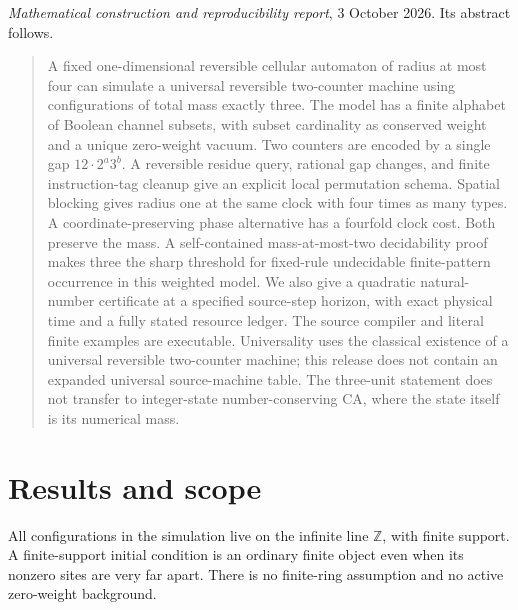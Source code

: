 \documentclass[11pt,letterpaper]{article}
\numberwithin{equation}{section}
\theoremstyle{definition}
\theoremstyle{remark}
\newcommand{\Z}{\mathbb Z}
\begin{document}
\bigskip
{}
\par
\noindent\emph{Mathematical construction and reproducibility report}, 3 October 2026. Its abstract follows.
\begin{quote}\small
A fixed one-dimensional reversible cellular automaton of radius at most four can simulate a universal reversible two-counter machine using configurations of total mass exactly three. The model has a finite alphabet of Boolean channel subsets, with subset cardinality as conserved weight and a unique zero-weight vacuum. Two counters are encoded by a single gap $12\cdot2^a3^b$. A reversible residue query, rational gap changes, and finite instruction-tag cleanup give an explicit local permutation schema. Spatial blocking gives radius one at the same clock with four times as many types. A coordinate-preserving phase alternative has a fourfold clock cost. Both preserve the mass. A self-contained mass-at-most-two decidability proof makes three the sharp threshold for fixed-rule undecidable finite-pattern occurrence in this weighted model. We also give a quadratic natural-number certificate at a specified source-step horizon, with exact physical time and a fully stated resource ledger. The source compiler and literal finite examples are executable. Universality uses the classical existence of a universal reversible two-counter machine; this release does not contain an expanded universal source-machine table. The three-unit statement does not transfer to integer-state number-conserving CA, where the state itself is its numerical mass.
\end{quote}

\section{Results and scope}\label{smc:tm:sec:results}

All configurations in the simulation live on the infinite line $\Z$, with finite support. A finite-support initial condition is an ordinary finite object even when its nonzero sites are very far apart. There is no finite-ring assumption and no active zero-weight background.
\end{document}
